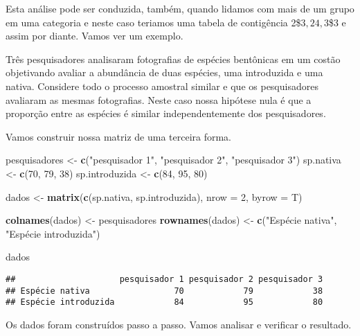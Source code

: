 \documentclass[titlepage, oneside, openany, a4paper]{book}
\newenvironment{Shaded}{\begin{snugshade}}{\end{snugshade}}
\newcommand{\DataTypeTok}[1]{\textcolor[rgb]{0.13,0.29,0.53}{#1}}
\newcommand{\DecValTok}[1]{\textcolor[rgb]{0.00,0.00,0.81}{#1}}
\newcommand{\KeywordTok}[1]{\textcolor[rgb]{0.13,0.29,0.53}{\textbf{#1}}}
\newcommand{\NormalTok}[1]{#1}
\newcommand{\StringTok}[1]{\textcolor[rgb]{0.31,0.60,0.02}{#1}}
\begin{document}
Esta análise pode ser conduzida, também, quando lidamos com mais de um grupo em uma categoria e neste caso teriamos uma tabela de contigência 2\$\times\(3, 2\)\times\(4, 3\)\times\$3 e assim por diante. Vamos ver um exemplo.

Três pesquisadores analisaram fotografias de espécies bentônicas em um costão objetivando avaliar a abundância de duas espécies, uma introduzida e uma nativa. Considere todo o processo amostral similar e que os pesquisadores avaliaram as mesmas fotografias. Neste caso nossa hipótese nula é que a proporção entre as espécies é similar independentemente dos pesquisadores.

Vamos construir nossa matriz de uma terceira forma.

\begin{Shaded}
\begin{Highlighting}[]
\NormalTok{pesquisadores <-}\StringTok{ }\KeywordTok{c}\NormalTok{(}\StringTok{"pesquisador 1"}\NormalTok{, }\StringTok{"pesquisador 2"}\NormalTok{, }\StringTok{"pesquisador 3"}\NormalTok{)}
\NormalTok{sp.nativa <-}\StringTok{ }\KeywordTok{c}\NormalTok{(}\DecValTok{70}\NormalTok{, }\DecValTok{79}\NormalTok{, }\DecValTok{38}\NormalTok{)}
\NormalTok{sp.introduzida <-}\StringTok{ }\KeywordTok{c}\NormalTok{(}\DecValTok{84}\NormalTok{, }\DecValTok{95}\NormalTok{, }\DecValTok{80}\NormalTok{)}

\NormalTok{dados <-}\StringTok{ }\KeywordTok{matrix}\NormalTok{(}\KeywordTok{c}\NormalTok{(sp.nativa, sp.introduzida), }\DataTypeTok{nrow =} \DecValTok{2}\NormalTok{, }\DataTypeTok{byrow =}\NormalTok{ T)}

\KeywordTok{colnames}\NormalTok{(dados) <-}\StringTok{ }\NormalTok{pesquisadores}
\KeywordTok{rownames}\NormalTok{(dados) <-}\StringTok{ }\KeywordTok{c}\NormalTok{(}\StringTok{"Espécie nativa"}\NormalTok{, }\StringTok{"Espécie introduzida"}\NormalTok{)}

\NormalTok{dados}
\end{Highlighting}
\end{Shaded}

\begin{verbatim}
##                     pesquisador 1 pesquisador 2 pesquisador 3
## Espécie nativa                 70            79            38
## Espécie introduzida            84            95            80
\end{verbatim}

Os dados foram construídos passo a passo. Vamos analisar e verificar o resultado.
\end{document}
